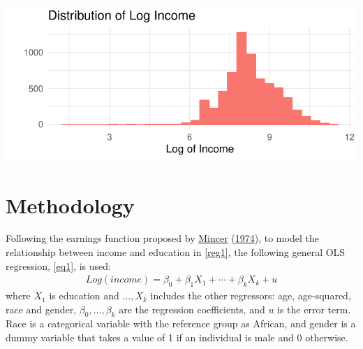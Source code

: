 \documentclass[11pt,preprint, authoryear]{elsarticle}
\let\origfigure\figure
\let\endorigfigure\endfigure
\renewenvironment{figure}[1][2] {
    \expandafter\origfigure\expandafter[H]
} {
    \endorigfigure
}
\numberwithin{equation}{section}
\numberwithin{figure}{section}
\numberwithin{table}{section}
\begin{document}
\begin{figure}[H]

{\centering \includegraphics{20346212CSproj_files/figure-latex/incomergraph-1} 

}

\caption{Log Income Distribution  \label{Figure3}}\label{fig:incomergraph}
\end{figure}

\hypertarget{methodology}{%
\section{\texorpdfstring{Methodology
\label{meth}}{Methodology }}\label{methodology}}

Following the earnings function proposed by
\protect\hyperlink{ref-mince}{Mincer}
(\protect\hyperlink{ref-mince}{1974}), to model the relationship between
income and education in \ref{reg1}, the following general OLS
regression, \ref{eq1}, is used: \begin{align}
Log(income)=\beta_{0}+\beta_{1} X_{1}+\cdots+\beta_{k} X_{k}+u  \label{eq1}
\end{align} where \(X_{1}\) is education and \(\ldots, X_{k}\) includes
the other regressors: age, age-squared, race and gender,
\(\beta_{0}, \ldots, \beta_{k}\) are the regression coefficients, and
\(u\) is the error term. Race is a categorical variable with the
reference group as African, and gender is a dummy variable that takes a
value of 1 if an individual is male and 0 otherwise.
\end{document}
